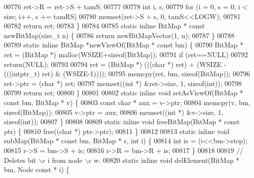 \begin{DoxyCode}
00776         ret->R = ret->S + tamS;
00777 
00778         \textcolor{keywordtype}{int} i, s;
00779         \textcolor{keywordflow}{for} (i = 0, s = 0; i < size; i++, s += tamRS)
00780                 memset(ret->S + s, 0, tamS<<LOGW);
00781 
00782         \textcolor{keywordflow}{return} ret;
00783 \}
00784 
00785 \textcolor{keyword}{static} \textcolor{keyword}{inline} BitMap * \textcolor{keyword}{const} newBitMap(\textcolor{keywordtype}{size\_t} n) \{
00786         \textcolor{keywordflow}{return} newBitMapVector(1, n);
00787 \}
00788 
00789 \textcolor{keyword}{static} \textcolor{keyword}{inline} BitMap *newViewOf(BitMap * \textcolor{keyword}{const} bm) \{
00790         BitMap * ret = (BitMap *) malloc(WSIZE+\textcolor{keyword}{sizeof}(BitMap));
00791         \textcolor{keywordflow}{if} (ret==NULL)
00792                 \textcolor{keywordflow}{return}(NULL);
00793 
00794         ret =  (BitMap *) (((\textcolor{keywordtype}{char} *) ret) + (WSIZE - (((intptr\_t) ret) & (WSIZE-1))));
00795         memcpy(ret, bm, \textcolor{keyword}{sizeof}(BitMap));
00796         ret->ptr = (\textcolor{keywordtype}{char} *) ret;
00797         memset((\textcolor{keywordtype}{int} *) &ret->size, 1, \textcolor{keyword}{sizeof}(\textcolor{keywordtype}{int}));
00798 
00799         \textcolor{keywordflow}{return} ret;
00800 \}
00801 
00802 \textcolor{keyword}{static} \textcolor{keyword}{inline} \textcolor{keywordtype}{void} setAsViewOf(BitMap * \textcolor{keyword}{const} bm, BitMap * v) \{
00803         \textcolor{keyword}{const} \textcolor{keywordtype}{char} * aux = v->ptr;
00804         memcpy(v, bm, \textcolor{keyword}{sizeof}(BitMap));
00805         v->ptr = aux;
00806         memset((\textcolor{keywordtype}{int} *) &v->size, 1, \textcolor{keyword}{sizeof}(\textcolor{keywordtype}{int}));
00807 \}
00808 
00809 \textcolor{keyword}{static} \textcolor{keyword}{inline} \textcolor{keywordtype}{void} freeBitMap(BitMap * \textcolor{keyword}{const} ptr) \{
00810         free((\textcolor{keywordtype}{char} *) ptr->ptr);
00811 \}
00812 
00813 \textcolor{keyword}{static} \textcolor{keyword}{inline} \textcolor{keywordtype}{void} subMap(BitMap * \textcolor{keyword}{const} bm, BitMap * r, \textcolor{keywordtype}{int} i) \{
00814         \textcolor{keywordtype}{int} is = (i<<bm->step);
00815         r->S = bm->S + is;
00816         r->R = bm->R + is;
00817 \}
00818 
00819 \textcolor{comment}{// Deletes bit \(\backslash\)c i from node \(\backslash\)c w.}
00820 \textcolor{keyword}{static} \textcolor{keyword}{inline} \textcolor{keywordtype}{void} delElement(BitMap * bm, Node \textcolor{keyword}{const} * i) \{

\end{DoxyCode}
